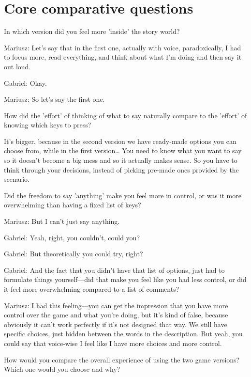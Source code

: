 \section{Core comparative questions}

\begin{QandA}
   \item In which version did you feel more 'inside' the story world?
         \begin{answered}
            Mariusz: Let’s say that in the first one, actually with voice, paradoxically, I had to focus more, read everything, and think about what I’m doing and then say it out loud.

            Gabriel: Okay.

            Mariusz: So let’s say the first one.
           
         \end{answered}

   \item How did the 'effort' of thinking of what to say naturally compare to the 'effort' of knowing which keys to press?

         \begin{answered}
            It’s bigger, because in the second version we have ready-made options you can choose from, while in the first version…
            You need to know what you want to say so it doesn’t become a big mess and so it actually makes sense.
            So you have to think through your decisions, instead of picking pre-made ones provided by the scenario.
         \end{answered}

    \item Did the freedom to say 'anything' make you feel more in control, or was it more overwhelming than having a fixed list of keys?

         \begin{answered}
            Mariusz: But I can’t just say anything.

            Gabriel: Yeah, right, you couldn’t, could you?

            Gabriel: But theoretically you could try, right?

            Gabriel: And the fact that you didn’t have that list of options, just had to formulate things yourself—did that make you feel like you had less control, or did it feel more overwhelming compared to a list of comments?

            Mariusz: I had this feeling—you can get the impression that you have more control over the game and what you’re doing, but it’s kind of false, because obviously it can’t work perfectly if it’s not designed that way.
            We still have specific choices, just hidden between the words in the description.
            But yeah, you could say that voice-wise I feel like I have more choices and more control.
         \end{answered}
    \item How would you compare the overall experience of using the two game versions? Which one would you choose and why?


\end{QandA}
